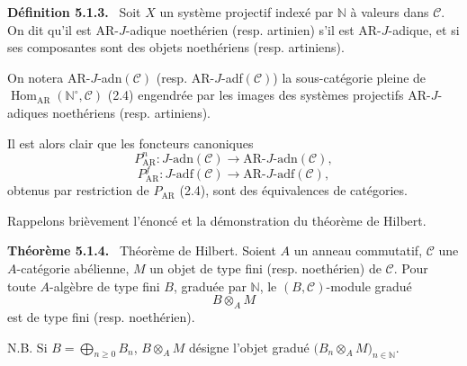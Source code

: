 \documentclass[11pt]{article}
\newenvironment{statement}[1]{\par\medskip\noindent\textbf{#1.}\ }{\par\medskip}
\DeclareMathOperator{\Hom}{Hom}
\providecommand{\Hom}{\operatorname{Hom}}
\providecommand{\Hom}{\operatorname{Hom}}
\begin{document}
\begin{statement}{Définition 5.1.3}
Soit \(X\) un système projectif indexé par \(\mathbb N\) à valeurs dans \(\mathcal C\). On dit qu'il est AR-\(J\)-adique noethérien (resp. artinien) s'il est AR-\(J\)-adique, et si ses composantes sont des objets noethériens (resp. artiniens).
\end{statement}

On notera AR-\(J\)-adn\((\mathcal C)\) (resp. AR-\(J\)-adf\((\mathcal C)\)) la sous-catégorie pleine de \(\Hom_{\mathrm{AR}}(\mathbb N^\circ,\mathcal C)\) (2.4) engendrée par les images des systèmes projectifs AR-\(J\)-adiques noethériens (resp. artiniens).

Il est alors clair que les foncteurs canoniques
\[
P^n_{\mathrm{AR}}:J\text{-adn}(\mathcal C)\longrightarrow \mathrm{AR}\text{-}J\text{-adn}(\mathcal C),
\]
\[
P^f_{\mathrm{AR}}:J\text{-adf}(\mathcal C)\longrightarrow \mathrm{AR}\text{-}J\text{-adf}(\mathcal C),
\]
obtenus par restriction de \(P_{\mathrm{AR}}\) (2.4), sont des équivalences de catégories.

Rappelons brièvement l'énoncé et la démonstration du théorème de Hilbert.

\begin{statement}{Théorème 5.1.4}
Théorème de Hilbert. Soient \(A\) un anneau commutatif, \(\mathcal C\) une \(A\)-catégorie abélienne, \(M\) un objet de type fini (resp. noethérien) de \(\mathcal C\). Pour toute \(A\)-algèbre de type fini \(B\), graduée par \(\mathbb N\), le \((B,\mathcal C)\)-module gradué
\[
B\otimes_A M
\]
est de type fini (resp. noethérien).

N.B. Si \(B=\bigoplus_{n\ge0}B_n\), \(B\otimes_A M\) désigne l'objet gradué \(\bigl(B_n\otimes_A M\bigr)_{n\in\mathbb N}\).
\end{statement}
\end{document}

